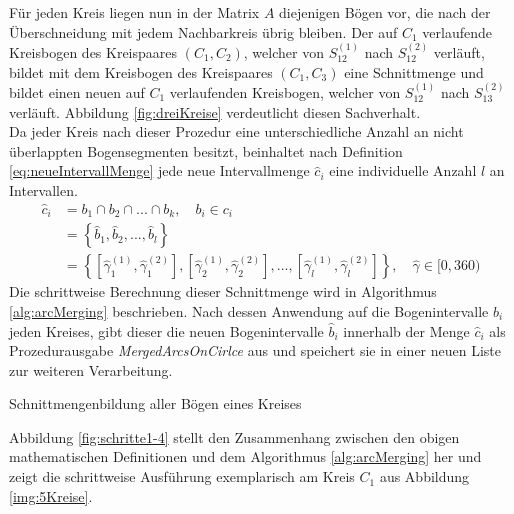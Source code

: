 \documentclass[accentcolor=tud1c, 11pt, toc=bib, toc=listof, captions=abovetable, parskip=half]{tudreport}
\begin{document}
Für jeden Kreis liegen nun in der Matrix $A$ diejenigen Bögen vor, die nach der Überschneidung mit jedem Nachbarkreis übrig bleiben. Der auf $C_1$ verlaufende Kreisbogen des Kreispaares $(C_1,C_2)$, welcher von $S_{12}^{(1)}$ nach $S_{12}^{(2)}$ verläuft, bildet mit dem Kreisbogen des Kreispaares $(C_1,C_3)$ eine Schnittmenge und bildet einen neuen auf $C_1$ verlaufenden Kreisbogen, welcher von $S_{12}^{(1)}$ nach $S_{13}^{(2)}$ verläuft. Abbildung \ref{fig:dreiKreise} verdeutlicht diesen Sachverhalt.\\
Da jeder Kreis nach dieser Prozedur eine unterschiedliche Anzahl an nicht überlappten Bogensegmenten besitzt, beinhaltet nach Definition \ref{eq:neueIntervallMenge} jede neue Intervallmenge $\hat{c}_i$ eine individuelle Anzahl $l$ an Intervallen. 
\begin{equation}
\begin{aligned}
\hat{c}_i &= b_1 \cap b_2 \cap ... \cap b_k, \quad b_i \in c_i \\
&= \left\{\hat{b}_1, \hat{b}_2,..., \hat{b}_l\right\} \\
& = \left\{\left[\hat{\gamma}_1^{(1)},\hat{\gamma}_1^{(2)}\right], \left[\hat{\gamma}_2^{(1)},\hat{\gamma}_2^{(2)}\right],..., \left[\hat{\gamma}_l^{(1)},\hat{\gamma}_l^{(2)}\right]\right\}, \quad \hat{\gamma} \in [0,360)
\end{aligned}
\label{eq:neueIntervallMenge}
\end{equation}
Die schrittweise Berechnung dieser Schnittmenge wird in Algorithmus \ref{alg:arcMerging} beschrieben. Nach dessen Anwendung auf die Bogenintervalle $b_i$ jeden Kreises, gibt dieser die neuen Bogenintervalle $\hat{b}_i$ innerhalb der Menge $\hat{c}_i$ als Prozedurausgabe \textit{MergedArcsOnCirlce} aus und speichert sie in einer neuen Liste zur weiteren Verarbeitung.\\

\begin{algorithm}[t]
  \caption{Schnittmengenbildung aller Bögen eines Kreises}
  \label{alg:arcMerging}
  
\end{algorithm}

Abbildung \ref{fig:schritte1-4} stellt den Zusammenhang zwischen den obigen mathematischen Definitionen und dem Algorithmus \ref{alg:arcMerging} her und zeigt die schrittweise Ausführung exemplarisch am Kreis $C_1$ aus Abbildung \ref{img:5Kreise}.\\
\end{document}
